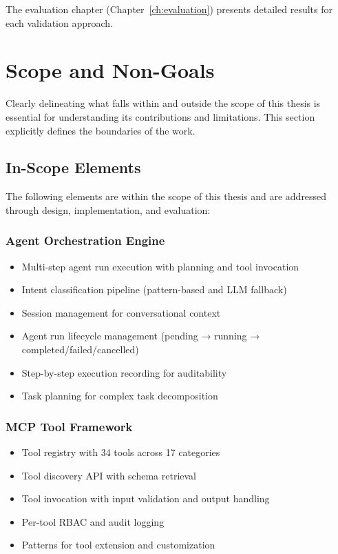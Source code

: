 \documentclass[a4paper,twoside]{sapthesis}
\begin{document}
The evaluation chapter (Chapter~\ref{ch:evaluation}) presents detailed results for each validation approach.

\section{Scope and Non-Goals}
\label{sec:scope-nongoals}

Clearly delineating what falls within and outside the scope of this thesis is essential for understanding its contributions and limitations. This section explicitly defines the boundaries of the work.

\subsection{In-Scope Elements}

The following elements are within the scope of this thesis and are addressed through design, implementation, and evaluation:

\subsubsection{Agent Orchestration Engine}

\begin{itemize}
    \item Multi-step agent run execution with planning and tool invocation
    \item Intent classification pipeline (pattern-based and LLM fallback)
    \item Session management for conversational context
    \item Agent run lifecycle management (pending → running → completed/failed/cancelled)
    \item Step-by-step execution recording for auditability
    \item Task planning for complex task decomposition
\end{itemize}

\subsubsection{MCP Tool Framework}

\begin{itemize}
    \item Tool registry with 34 tools across 17 categories
    \item Tool discovery API with schema retrieval
    \item Tool invocation with input validation and output handling
    \item Per-tool RBAC and audit logging
    \item Patterns for tool extension and customization
\end{itemize}
\end{document}
